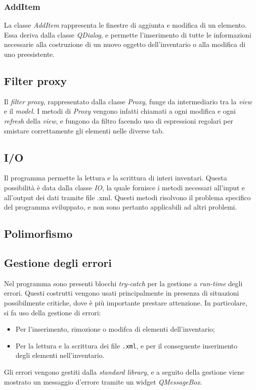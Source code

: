 \subsubsection{AddItem}
La classe \textit{AddItem} rappresenta le finestre di aggiunta e modifica di un elemento. Essa deriva dalla classe \textit{QDialog}, e permette l'inserimento di tutte le informazioni necessarie alla costruzione di un nuovo oggetto dell'inventario o alla modifica di uno preesistente.

\subsection{Filter proxy}
Il \textit{filter proxy}, rappresentato dalla classe \textit{Proxy}, funge da intermediario tra la \textit{view} e il \textit{model}. I metodi di \textit{Proxy} vengono infatti chiamati a ogni modifica e ogni \textit{refresh} della \textit{view}, e fungono da filtro facendo uso di espressioni regolari per smistare correttamente gli elementi nelle diverse tab.

\subsection{I/O}
Il programma permette la lettura e la scrittura di interi inventari. Questa possibilità è data dalla classe \textit{IO}, la quale fornisce i metodi necessari all'input e all'output dei dati tramite file .xml. Questi metodi risolvono il problema specifico del programma sviluppato, e non sono pertanto applicabili ad altri problemi.

\subsection{Polimorfismo}


\subsection{Gestione degli errori}
Nel programma sono presenti blocchi \textit{try-catch} per la gestione a \textit{run-time} degli errori. Questi costrutti vengono usati principalmente in presenza di situazioni possibilmente critiche, dove è più importante prestare attenzione. In particolare, si fa uso della gestione di errori:
\begin{itemize}
  \item Per l'inserimento, rimozione o modifca di elementi dell'inventario;
  \item Per la lettura e la scrittura dei file \texttt{.xml}, e per il conseguente inserimento degli elementi nell'inventario.
\end{itemize}
Gli errori vengono gestiti dalla \textit{standard library}, e a seguito della gestione viene mostrato un messaggio d'errore tramite un widget \textit{QMessageBox}.


